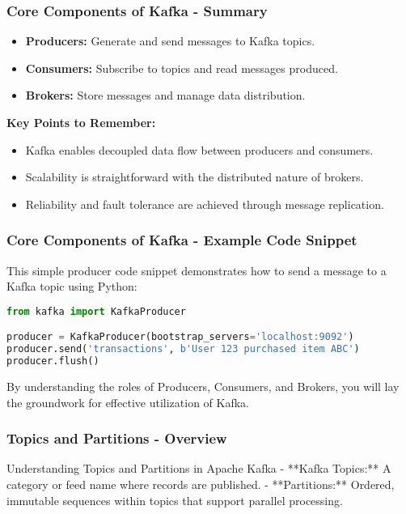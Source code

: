 \documentclass[aspectratio=169]{beamer}
\begin{document}
\begin{frame}[fragile]
    \frametitle{Core Components of Kafka - Summary}
    \begin{itemize}
        \item \textbf{Producers:} Generate and send messages to Kafka topics.
        \item \textbf{Consumers:} Subscribe to topics and read messages produced.
        \item \textbf{Brokers:} Store messages and manage data distribution.
    \end{itemize}

    \textbf{Key Points to Remember:}
    \begin{itemize}
        \item Kafka enables decoupled data flow between producers and consumers.
        \item Scalability is straightforward with the distributed nature of brokers.
        \item Reliability and fault tolerance are achieved through message replication.
    \end{itemize}
\end{frame}

\begin{frame}[fragile]
    \frametitle{Core Components of Kafka - Example Code Snippet}
    This simple producer code snippet demonstrates how to send a message to a Kafka topic using Python:

    \begin{lstlisting}[language=Python]
from kafka import KafkaProducer

producer = KafkaProducer(bootstrap_servers='localhost:9092')
producer.send('transactions', b'User 123 purchased item ABC')
producer.flush()
    \end{lstlisting}
    
    By understanding the roles of Producers, Consumers, and Brokers, you will lay the groundwork for effective utilization of Kafka.
\end{frame}

\begin{frame}[fragile]
    \frametitle{Topics and Partitions - Overview}
    \begin{block}{Understanding Topics and Partitions in Apache Kafka}
        - **Kafka Topics:** A category or feed name where records are published.
        - **Partitions:** Ordered, immutable sequences within topics that support parallel processing.
    \end{block}
\end{frame}
\end{document}
